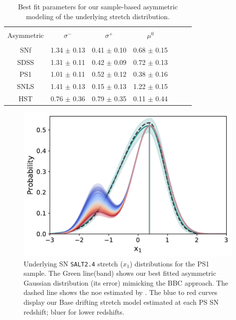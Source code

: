 \documentclass[]{aa} %
\begin{document}

\begin{table}
    \centering
    \caption{Best fit parameters for our sample-based asymmetric modeling of the
    underlying stretch distribution.}
    \label{tab:bbc}
    \begin{tabular}{c c c c c c c}\hline\hline\\[-0.8em]
    Asymmetric & $\sigma^-$ & $\sigma^+$ & $\mu^0$ \\\hline\\[-0.8em]
    SNf &  1.34 $\pm$ 0.13 & 0.41 $\pm$ 0.10 & 0.68 $\pm$ 0.15\\[0.15em]
    SDSS & 1.31 $\pm$ 0.11 & 0.42 $\pm$ 0.09 & 0.72 $\pm$ 0.13 \\[0.15em]
    PS1 &  1.01 $\pm$ 0.11 & 0.52 $\pm$ 0.12 & 0.38 $\pm$ 0.16 \\[0.15em]
    SNLS & 1.41 $\pm$ 0.13 & 0.15 $\pm$ 0.13 & 1.22 $\pm$ 0.15 \\[0.15em]
    HST &  0.76 $\pm$ 0.36 & 0.79 $\pm$ 0.35 & 0.11 $\pm$ 0.44 \\\hline\hline
    \end{tabular}
\end{table}

\begin{figure}
    \centering
    \includegraphics[width=\linewidth]{Article_figures/bbc_comp_PS1.pdf}
    \caption{Underlying SN \textsc{\texttt{SALT2.4}} stretch ($x_1$)
        distributions for the PS1 sample. The Green line(band) shows our best
        fitted asymmetric Gaussian distribution (its error) mimicking the BBC
        approach. The dashed line shows the noe estimated by
    \cite{scolnic2018a}. The blue to red curves display our Base drifting
stretch model estimated at each PS SN redshift; bluer for lower redshifts.}
    \label{fig:bbc_pdf_ps1}
\end{figure}
\end{document}
